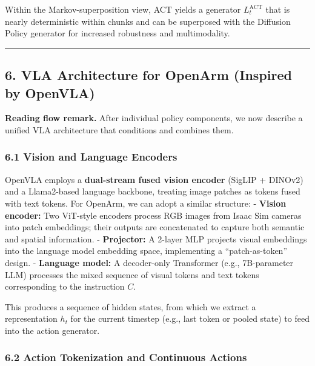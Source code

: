 \documentclass[
]{article}
\theoremstyle{remark}
\begin{document}
Within the Markov-superposition view, ACT yields a generator
\(L_t^{\text{ACT}}\) that is nearly deterministic within chunks and can
be superposed with the Diffusion Policy generator for increased
robustness and multimodality. \cite{diffpolicy-theory-notes,act-openarm-notes,gm2025}

\begin{center}\rule{0.5\linewidth}{0.5pt}\end{center}

\subsection{6. VLA Architecture for OpenArm (Inspired by
OpenVLA)}\label{vla-architecture-for-openarm-inspired-by-openvla}

\textbf{Reading flow remark.} After individual policy components, we now describe a unified VLA architecture that conditions and combines them.

\subsubsection{6.1 Vision and Language
Encoders}\label{vision-and-language-encoders}

OpenVLA employs a \textbf{dual-stream fused vision encoder} (SigLIP +
DINOv2) and a Llama2-based language backbone, treating image patches as
tokens fused with text tokens. For OpenArm, we can adopt a similar
structure: \cite{openvla-notes} - \textbf{Vision encoder:} Two ViT-style encoders
process RGB images from Isaac Sim cameras into patch embeddings; their
outputs are concatenated to capture both semantic and spatial
information. \cite{isaaclab-github,openvla-notes} - \textbf{Projector:} A 2-layer MLP
projects visual embeddings into the language model embedding space,
implementing a ``patch-as-token'' design. \cite{openvla-notes} - \textbf{Language
model:} A decoder-only Transformer (e.g., 7B-parameter LLM) processes
the mixed sequence of visual tokens and text tokens corresponding to the
instruction \(C\). \cite{openvla-notes}

This produces a sequence of hidden states, from which we extract a
representation \(h_t\) for the current timestep (e.g., last token or
pooled state) to feed into the action generator. \cite{openvla-notes}

\subsubsection{6.2 Action Tokenization and Continuous
Actions}\label{action-tokenization-and-continuous-actions}
\end{document}

